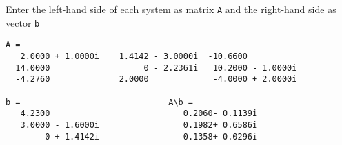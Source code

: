 Enter the left-hand side of each system as matrix {\tt A} 
and the right-hand side as vector {\tt b}

\begin{verbatim}
A =
   2.0000 + 1.0000i    1.4142 - 3.0000i  -10.6600
  14.0000                   0 - 2.2361i   10.2000 - 1.0000i
  -4.2760              2.0000             -4.0000 + 2.0000i

b =                              A\b =
   4.2300                           0.2060- 0.1139i
   3.0000 - 1.6000i                 0.1982+ 0.6586i
        0 + 1.4142i                -0.1358+ 0.0296i
\end{verbatim}






















